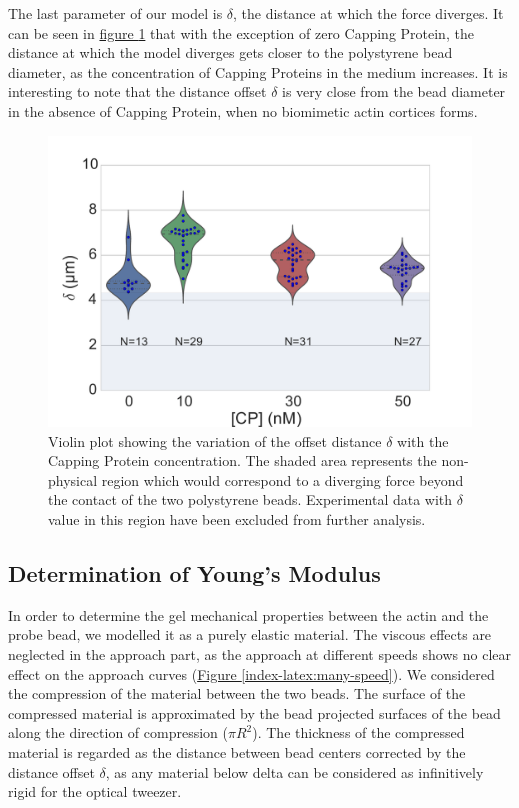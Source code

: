 \documentclass[A4paperpaper,11pt,english]{sphinxmanual}
\begin{document}
The last parameter of our model is \(\delta\), the distance at which the force
diverges.   It can be seen in \hyperref[index-latex:delta-violin]{figure  \ref*{index-latex:delta-violin}} that with the exception
of zero Capping Protein, the distance at which the model diverges gets
closer to the polystyrene bead diameter, as the concentration of Capping
Proteins in the medium increases. It is interesting to note that the distance offset
\(\delta\) is very close from the bead diameter in the absence of Capping Protein, when no
biomimetic actin cortices forms.
\begin{figure}[htbp]
\centering
\capstart

\includegraphics[width=0.800\linewidth]{delta_violin.pdf}
\caption{Violin plot showing the variation of the offset distance \(\delta\)
with the Capping Protein concentration. The shaded area represents the
non-physical region which would correspond to a diverging force beyond the
contact of the two polystyrene beads. Experimental data with \(\delta\)
value in this region have been excluded from further analysis.}\label{index-latex:delta-violin}\end{figure}


\subsection{Determination of Young's Modulus}
\label{index-latex:determination-of-young-s-modulus}
In order to determine the gel mechanical properties between the actin and the
probe bead, we modelled it as a purely elastic material. The viscous effects are
neglected in the approach part, as the approach at different speeds shows no
clear effect on the approach curves (\hyperref[index-latex:many-speed]{Figure  \ref*{index-latex:many-speed}}). We considered
the compression of the material between the two beads. The surface of the
compressed material is approximated by the bead projected surfaces of the bead along the
direction of compression (\(\pi R^2\)).  The thickness of the compressed
material is regarded as the distance between bead centers corrected by the
distance offset \(\delta\), as any material below delta can be considered as
infinitively rigid for the optical tweezer.
\end{document}
